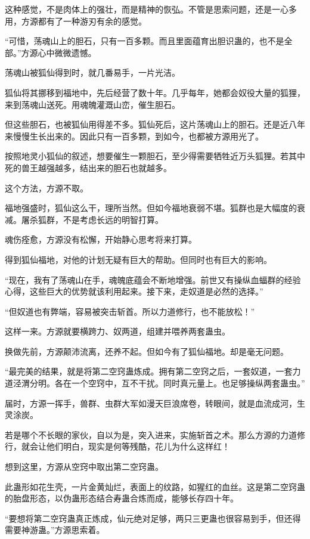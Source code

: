 \begin{this_body}
这种感觉，不是肉体上的强壮，而是精神的恢弘。不管是思索问题，还是一心多用，方源都有了一种游刃有余的感觉。

“可惜，荡魂山上的胆石，只有一百多颗。而且里面蕴育出胆识蛊的，也不是全部。”方源心中微微遗憾。

荡魂山被狐仙得到时，就几番易手，一片光洁。

狐仙将其挪移到福地中，先后经营了数十年。几乎每年，她都会奴役大量的狐狸，来到荡魂山送死。用魂魄灌溉山峦，催生胆石。

但这些胆石，也被狐仙用得差不多。狐仙死后，这片荡魂山上的胆石。还是近八年来慢慢生长出来的。因此只有一百多颗，到如今，也都被方源用光了。

按照地灵小狐仙的叙述，想要催生一颗胆石，至少得需要牺牲近万头狐狸。若其中死的兽王越强越多，结出来的胆石也就越多。

这个方法，方源不取。

福地强盛时，狐仙这么干，理所当然。但如今福地衰弱不堪。狐群也是大幅度的衰减。屠杀狐群，不是考虑长远的明智打算。

魂伤痊愈，方源没有松懈，开始静心思考将来打算。

得到狐仙福地，对他的计划无疑有巨大的帮助。但同时也有巨大的影响。

“现在，我有了荡魂山在手，魂魄底蕴会不断地增强。前世又有操纵血蝠群的经验心得，这些巨大的优势就该利用起来。接下来，走奴道是必然的选择。”

“但奴道也有弊端，容易被突击斩首。所以力道修行，也不能放松！”

这样一来。方源就要横跨力、奴两道，组建并喂养两套蛊虫。

换做先前，方源颠沛流离，还养不起。但如今有了狐仙福地。却是毫无问题。

“最完美的结果，就是将第二空窍蛊炼成。拥有第二空窍之后，一套奴道，一套力道泾渭分明。各在一个空窍中，互不干扰。同时真元量上。也足够操纵两套蛊虫。”

届时，方源一挥手，兽群、虫群大军如漫天巨浪席卷，转眼间，就是血流成河，生灵涂炭。

若是哪个不长眼的家伙，自以为是，突入进来，实施斩首之术。那么方源的力道修行，就会让他们明白，现实是何等残酷，花儿为什么这样红！

想到这里，方源从空窍中取出第二空窍蛊。

此蛊形如花生壳，一片金黄灿烂，表面上的纹路，如猩红的血丝。这是第二空窍蛊的胎盘形态，以伪蛊形态结合寿蛊合炼而成，能够长存四十年。

“要想将第二空窍蛊真正炼成，仙元绝对足够，两只三更蛊也很容易到手，但还得需要神游蛊。”方源思索着。


\end{this_body}
